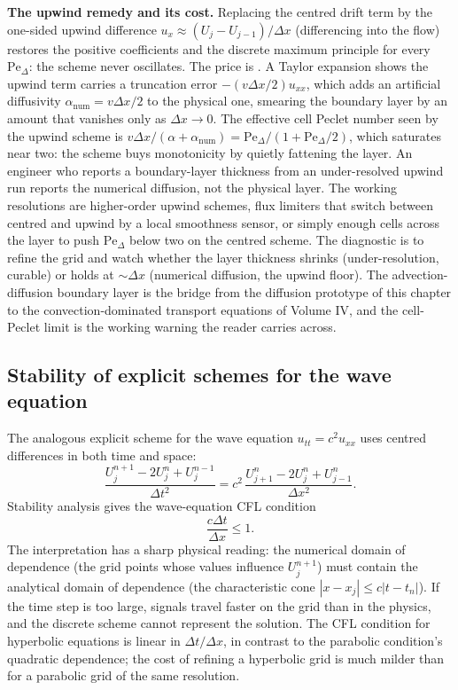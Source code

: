 \textbf{The upwind remedy and its cost.} Replacing the centred drift
term by the one-sided upwind difference $u_{x} \approx (U_{j} -
U_{j-1})/\Delta x$ (differencing into the flow) restores the
positive coefficients and the discrete maximum principle for every
$\mathrm{Pe}_{\Delta}$: the scheme never oscillates. The price is
. A Taylor expansion shows the upwind
term carries a truncation error $-(v\Delta x/2)u_{xx}$, which adds an
artificial diffusivity $\alpha_{\text{num}} = v\Delta x/2$ to the
physical one, smearing the boundary layer by an amount that vanishes
only as $\Delta x \to 0$. The effective cell Peclet number seen by
the upwind scheme is $v\Delta x/(\alpha + \alpha_{\text{num}}) =
\mathrm{Pe}_{\Delta}/(1 + \mathrm{Pe}_{\Delta}/2)$, which saturates
near two: the scheme buys monotonicity by quietly fattening the
layer. An engineer who reports a boundary-layer thickness from an
under-resolved upwind run reports the numerical diffusion, not the
physical layer. The working resolutions are higher-order upwind
schemes, flux limiters that switch between centred and upwind by a
local smoothness sensor, or simply enough cells across the layer to
push $\mathrm{Pe}_{\Delta}$ below two on the centred scheme. The
diagnostic is to refine the grid and watch whether the layer
thickness shrinks (under-resolution, curable) or holds at $\sim
\Delta x$ (numerical diffusion, the upwind floor). The advection-
diffusion boundary layer is the bridge from the diffusion prototype
of this chapter to the convection-dominated transport equations of
Volume IV, and the cell-Peclet limit is the working warning the
reader carries across.

\subsection{Stability of explicit schemes for the wave equation}

The analogous explicit scheme for the wave equation $u_{tt} =
c^{2} u_{xx}$ uses centred differences in both time and space:
\[
\frac{U_{j}^{n+1} - 2 U_{j}^{n} + U_{j}^{n-1}}{\Delta t^{2}} = c^{2}\, \frac{U_{j+1}^{n} - 2 U_{j}^{n} + U_{j-1}^{n}}{\Delta x^{2}}.
\]
Stability analysis gives the wave-equation CFL condition
\[
\frac{c \Delta t}{\Delta x} \leq 1.
\]
The interpretation has a sharp physical reading: the numerical
domain of dependence (the grid points whose values influence
$U_{j}^{n+1}$) must contain the analytical domain of dependence
(the characteristic cone $|x - x_{j}| \leq c |t - t_{n}|$). If the
time step is too large, signals travel faster on the grid than in
the physics, and the discrete scheme cannot represent the
solution. The CFL condition for hyperbolic equations is linear in
$\Delta t/\Delta x$, in contrast to the parabolic condition's
quadratic dependence; the cost of refining a hyperbolic grid is
much milder than for a parabolic grid of the same resolution.

